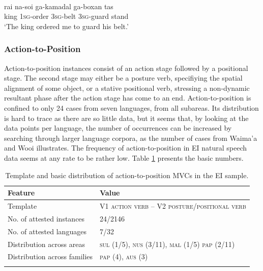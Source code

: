 \ea \label{Teiwa002}
\\
\gll rai na-soi ga-kamadal ga-boxan tas \\
king \textsc{1}\textsc{sg}-order \textsc{3}\textsc{sg}-belt \textsc{3}\textsc{sg}-guard stand \\
\glft `The king ordered me to guard his belt.'\\ 
\z

\subsubsection{Action-to-Position}\label{sec:action-to-position}

Action-to-position instances consist of an action stage followed by a positional stage. The second stage may either be a posture verb, specifiying the spatial alignment of some object, or a stative positional verb, stressing a non-dynamic resultant phase after the action stage has come to an end. Action-to-position is confined to only 24 cases from seven languages, from all subareas. Its distribution is hard to trace as there are so little data, but it seems that, by looking at the data points per language, the number of occurrences can be increased by searching through larger language corpora, as the number of cases from Waima'a and Wooi illustrates. The frequency of action-to-position in EI natural speech data seems at any rate to be rather low. Table \ref{table:action-to-position} presents the basic numbers.

\begin{table}
\begin{tabular}{ll}
\lsptoprule
Feature&Value\tabularnewline
\midrule
Template&V1 \textsc{action verb} -- V2 \textsc{posture/positional verb}\tabularnewline
No. of attested instances& 24/2146 \tabularnewline
No. of attested languages& 7/32 \tabularnewline
Distribution across areas& \textsc{sul} (1/5), \textsc{nus} (3/11), \textsc{mal} (1/5) \textsc{pap} (2/11) \tabularnewline
Distribution across families& \textsc{pap} (4), \textsc{aus} (3) \tabularnewline
\lspbottomrule
\end{tabular}
\caption[Template and basic distribution of action-to-position MVCs]{Template and basic distribution of action-to-position MVCs in the EI sample.}
\label{table:action-to-position}
\end{table}



